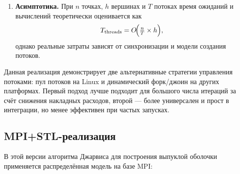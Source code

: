 \documentclass[12pt,a4paper]{article}
\begin{document}
\begin{enumerate}
  \item \textbf{Асимптотика.}  
    При \(n\) точках, \(h\) вершинах и \(T\) потоках время ожиданий и вычислений теоретически оценивается как
    \[
      T_{\mathrm{threads}} = O\!\Bigl(\tfrac{n}{T}\times h\Bigr),
    \]
    однако реальные затраты зависят от синхронизации и модели создания потоков.
\end{enumerate}

Данная реализация демонстрирует две альтернативные стратегии управления потоками: пул потоков на Linux и динамический форк/джоин на других платформах. Первый подход лучше подходит для большого числа итераций за счёт снижения накладных расходов, второй — более универсален и прост в интеграции, но менее эффективен при частых запусках.

\subsection*{MPI+STL-реализация}

В этой версии алгоритма Джарвиса для построения выпуклой оболочки применяется распределённая модель на базе MPI:
\end{document}
